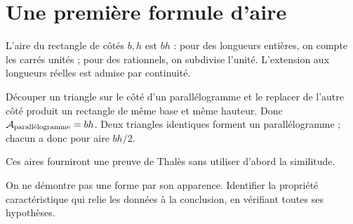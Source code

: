 \documentclass[../cours_3e.tex]{subfiles}
\begin{document}
\section{Une première formule d'aire}
L'aire du rectangle de côtés $b,h$ est $bh$ : pour des longueurs entières, on compte les carrés unités ; pour des rationnels, on subdivise l'unité. L'extension aux longueurs réelles est admise par continuité.
\begin{demonstration}
Découper un triangle sur le côté d'un parallélogramme et le replacer de l'autre côté produit un rectangle de même base et même hauteur. Donc $\mathcal{A}_{\text{parallélogramme}}=bh$. Deux triangles identiques forment un parallélogramme ; chacun a donc pour aire $bh/2$.
\end{demonstration}
Ces aires fourniront une preuve de Thalès sans utiliser d'abord la similitude.
\begin{retenir}
On ne démontre pas une forme par son apparence. Identifier la propriété caractéristique qui relie les données à la conclusion, en vérifiant toutes ses hypothèses.
\end{retenir}
\end{document}
